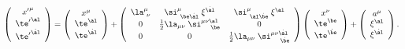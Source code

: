 \begin{equation} \label{sp}
\left(\begin{array}{c} {x'}^\mu \\ {\te'}^\al \\ {\te'}^{\dot{\al}} \end{array}\right)
=\left(\begin{array}{c} x^\mu \\ \te^\al \\ \te^{\dot{\al}} \end{array}\right)+
\left(\begin{array}{ccc} \la^\mu_{\ \nu} & \si^\mu_{\ \be\dot{\al}}\;\xi^{\dot{\al}} & \si^\mu_{\ \al\dot{\be}}\;\xi^{\al} \\
0 & \frac{1}{2}\la_{\mu\nu}\;\si^{\mu\nu\al}_{\ \ \ \,\be} & 0 \\
0 & 0 & \frac{1}{2}\la_{\mu\nu}\;\si^{\mu\nu\dot{\al}}_{\ \ \ \,\dot{\be}} \end{array}\right)
\left(\begin{array}{c} x^\nu \\ \te^\be \\ \te^{\dot{\be}} \end{array}\right) +
\left(\begin{array}{c} a^\mu \\ \xi^\al \\ \xi^{\dot{\al}} \end{array}\right).
\end{equation}

